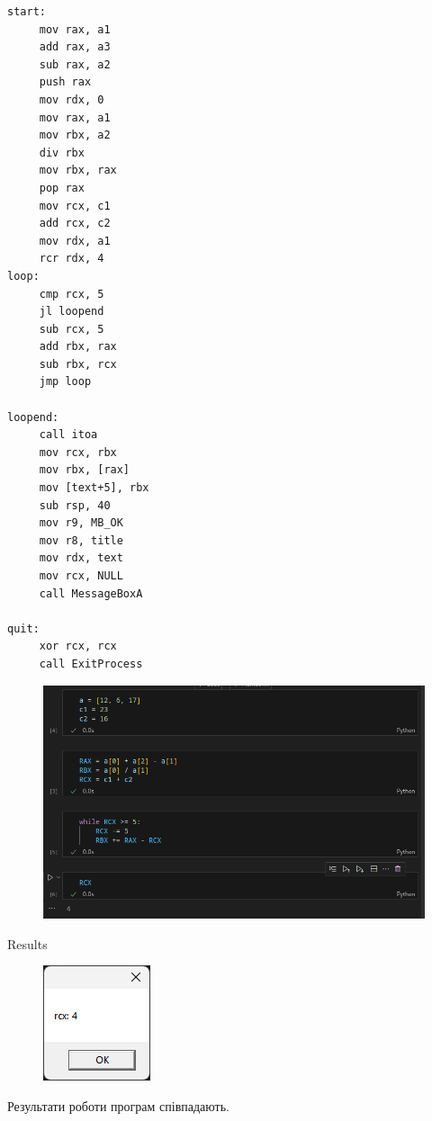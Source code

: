 \documentclass[a4paper,12pt]{article}
\begin{document}
\newpage
    \begin{lstlisting}[language=assembler]
start:
     mov rax, a1
     add rax, a3
     sub rax, a2
     push rax
     mov rdx, 0
     mov rax, a1
     mov rbx, a2
     div rbx
     mov rbx, rax
     pop rax
     mov rcx, c1
     add rcx, c2
     mov rdx, a1
     rcr rdx, 4
loop:
     cmp rcx, 5
     jl loopend
     sub rcx, 5
     add rbx, rax
     sub rbx, rcx
     jmp loop

loopend:
     call itoa
     mov rcx, rbx
     mov rbx, [rax]
     mov [text+5], rbx
     sub rsp, 40
     mov r9, MB_OK
     mov r8, title
     mov rdx, text
     mov rcx, NULL
     call MessageBoxA

quit:
     xor rcx, rcx
     call ExitProcess
    \end{lstlisting}

\newpage
    \begin{figure}[h!]
        \begin{minipage}[h]{1\linewidth}
            \centering
            \includegraphics[width=1\linewidth]{Prt sc/Python_code.png}  
        \end{minipage}
    \end{figure}

    \begin{center}
        \Large{Results}
    \end{center}
    \begin{figure}[h!]
        \begin{minipage}[h]{1\linewidth}
            \centering
            \includegraphics[width=0.2\linewidth]{Prt sc/Result.png}  
        \end{minipage}
    \end{figure}
    Результати роботи програм співпадають.
\end{document}
